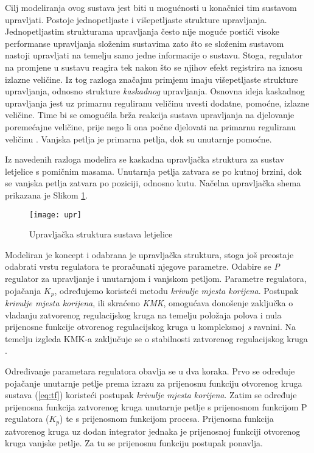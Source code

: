 \documentclass[11pt,a4paper]{article}
\begin{document}
Cilj modeliranja ovog sustava jest biti u mogućnosti u konačnici tim sustavom upravljati. Postoje jednopetljaste i višepetljaste strukture upravljanja. Jednopetljastim strukturama upravljanja često nije moguće postići visoke performanse upravljanja složenim sustavima zato što se složenim sustavom nastoji upravljati na temelju samo jedne informacije o sustavu. Stoga, regulator na promjene u sustavu reagira tek nakon što se njihov efekt registrira na iznosu izlazne veličine. Iz tog razloga značajnu primjenu imaju višepetljaste strukture upravljanja, odnosno strukture \textit{kaskadnog} upravljanja. Osnovna ideja kaskadnog upravljanja jest uz primarnu reguliranu veličinu uvesti dodatne, pomoćne, izlazne veličine. Time bi se omogućila brža reakcija sustava upravljanja na djelovanje poremećajne veličine, prije nego li ona počne djelovati na primarnu reguliranu veličinu \cite{uemp}. Vanjska petlja je primarna petlja, dok su unutarnje pomoćne.   

\medskip

Iz navedenih razloga modelira se kaskadna upravljačka struktura za sustav letjelice s pomičnim masama. Unutarnja petlja zatvara se po kutnoj brzini, dok se vanjska petlja zatvara po poziciji, odnosno kutu. Načelna upravljačka shema prikazana je Slikom \ref{fig:upr}. 


\begin{figure}[H]
	\centering
	\texttt{[image: upr]}
	\caption{Upravljačka struktura sustava letjelice}
	\label{fig:upr}
\end{figure}

\newpage

Modeliran je koncept i odabrana je upravljačka struktura, stoga još preostaje odabrati vrstu regulatora te proračunati njegove parametre. Odabire se \textit{P} regulator za upravljanje i unutarnjom i vanjskom petljom. Parametre regulatora, pojačanja $K_{p}$, određujemo koristeći metodu \textit{krivulje mjesta korijena}. Postupak \textit{krivulje mjesta korijena}, ili skraćeno \textit{KMK}, omogućava donošenje zaključka o vladanju zatvorenog regulacijskog kruga na temelju položaja polova i nula prijenosne funkcije otvorenog regulacijskog kruga u kompleksnoj \textit{s} ravnini. Na temelju izgleda KMK-a zaključuje se o stabilnosti zatvorenog regulacijskog kruga \cite{mato}. 

\medskip

Određivanje parametara regulatora obavlja se u dva koraka. Prvo se određuje pojačanje unutarnje petlje prema izrazu za prijenosnu funkciju otvorenog kruga sustava (\ref{eq:tf}) koristeći postupak \textit{krivulje mjesta korijena}. Zatim se određuje prijenosna funkcija zatvorenog kruga unutarnje petlje s prijenosnom funkcijom P regulatora ($K_{p}$) te s prijenosnom funkcijom procesa. Prijenosna funkcija zatvorenog kruga uz dodan integrator jednaka je prijenosnoj funkciji otvorenog kruga vanjske petlje. Za tu se prijenosnu funkciju postupak ponavlja.  
\end{document}
